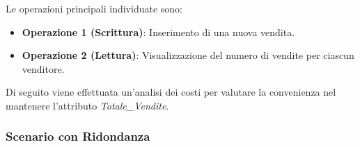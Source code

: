 Le operazioni principali individuate sono:

\begin{itemize}
    \item \textbf{Operazione 1 (Scrittura)}: Inserimento di una nuova vendita.
    \item \textbf{Operazione 2 (Lettura)}: Visualizzazione del numero di vendite per ciascun venditore.
\end{itemize}


Di seguito viene effettuata un'analisi dei costi per valutare la convenienza nel mantenere l'attributo \textit{Totale\_Vendite}.

\vspace{0.5cm}
\subsubsection{Scenario con Ridondanza}

